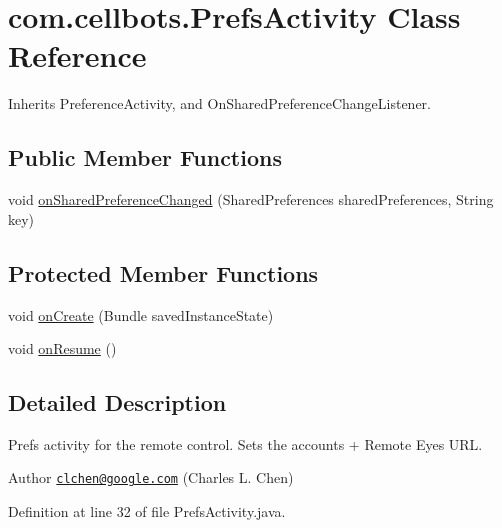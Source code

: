 \hypertarget{classcom_1_1cellbots_1_1_prefs_activity}{\section{com.\-cellbots.\-Prefs\-Activity Class Reference}
\label{classcom_1_1cellbots_1_1_prefs_activity}
}


Inherits Preference\-Activity, and On\-Shared\-Preference\-Change\-Listener.

\subsection*{Public Member Functions}
\begin{DoxyCompactItemize}
\item 
void \hyperlink{classcom_1_1cellbots_1_1_prefs_activity_a213977b179e50e6b411851911b7f0ad5}{on\-Shared\-Preference\-Changed} (Shared\-Preferences shared\-Preferences, String key)
\end{DoxyCompactItemize}
\subsection*{Protected Member Functions}
\begin{DoxyCompactItemize}
\item 
void \hyperlink{classcom_1_1cellbots_1_1_prefs_activity_a2712fe2f5b989b548449426c039d2f0c}{on\-Create} (Bundle saved\-Instance\-State)
\item 
void \hyperlink{classcom_1_1cellbots_1_1_prefs_activity_a6cac3aec8b514d27870cbd270bc2a6b5}{on\-Resume} ()
\end{DoxyCompactItemize}


\subsection{Detailed Description}
Prefs activity for the remote control. Sets the accounts + Remote Eyes U\-R\-L.

\begin{DoxyAuthor}{Author}
\href{mailto:clchen@google.com}{\tt clchen@google.\-com} (Charles L. Chen) 
\end{DoxyAuthor}


Definition at line 32 of file Prefs\-Activity.\-java.



